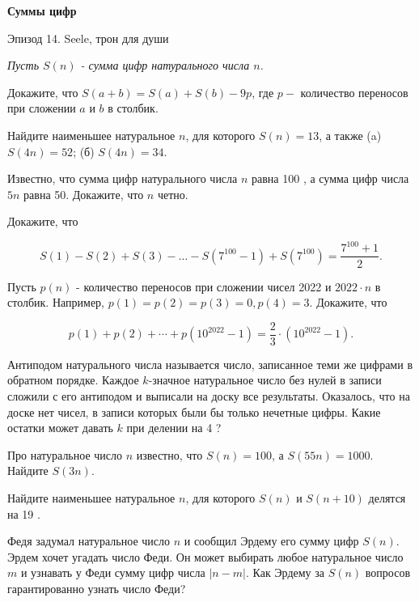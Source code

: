 \centerline{\bf \Huge Суммы цифр}

\begin{flushright}
        \scriptsize{Эпизод 14. Seele, трон для души}
\end{flushright}

\textit{Пусть $S(n)$ - сумма цифр натурального числа $n$.}

Докажите, что $S(a+b)=S(a)+S(b)-9 p$, где $p-$ количество переносов при сложении $a$ и $b$ в столбик.

Найдите наименьшее натуральное $n$, для которого $S(n)=13$, а также
(a) $S(4 n)=52$;
(б) $S(4 n)=34$.

Известно, что сумма цифр натурального числа $n$ равна 100 , а сумма цифр числа $5 n$ равна 50. Докажите, что $n$ четно.

Докажите, что

$$
S(1)-S(2)+S(3)-\ldots-S\left(7^{100}-1\right)+S\left(7^{100}\right)=\frac{7^{100}+1}{2} .
$$


Пусть $p(n)$ - количество переносов при сложении чисел 2022 и $2022 \cdot n$ в столбик. Например, $p(1)=p(2)=p(3)=0, p(4)=3$. Докажите, что

$$
p(1)+p(2)+\cdots+p\left(10^{2022}-1\right)=\frac{2}{3} \cdot\left(10^{2022}-1\right) .
$$


Антиподом натурального числа называется число, записанное теми же цифрами в обратном порядке. Каждое $k$-значное натуральное число без нулей в записи сложили с его антиподом и выписали на доску все результаты. Оказалось, что на доске нет чисел, в записи которых были бы только нечетные цифры. Какие остатки может давать $k$ при делении на 4 ?

Про натуральное число $n$ известно, что $S(n)=100$, а $S(55 n)=1000$. Найдите $S(3 n)$.

Найдите наименьшее натуральное $n$, для которого $S(n)$ и $S(n+10)$ делятся на 19 .

Федя задумал натуральное число $n$ и сообщил Эрдему его сумму цифр $S(n)$. Эрдем хочет угадать число Феди. Он может выбирать любое натуральное число $m$ и узнавать у Феди сумму цифр числа $|n-m|$. Как Эрдему за $S(n)$ вопросов гарантированно узнать число Феди?
